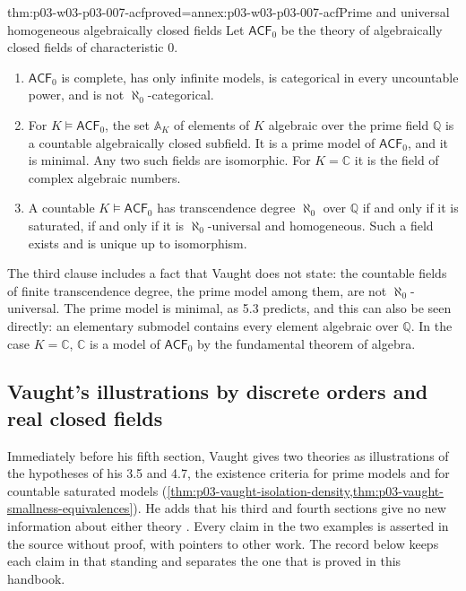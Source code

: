\begin{hbtheorem}{thm:p03-w03-p03-007-acf}{proved=annex:p03-w03-p03-007-acf}{Prime and universal homogeneous algebraically closed fields}
Let \(\mathsf{ACF}_0\) be the theory of algebraically closed fields of
characteristic \(0\).
\begin{enumerate}
\item \(\mathsf{ACF}_0\) is complete, has only infinite models, is
      categorical in every uncountable power, and is not
      \(\aleph_0\)-categorical.
\item For \(K\models\mathsf{ACF}_0\), the set \(\mathbb A_K\) of elements of
      \(K\) algebraic over the prime field \(\mathbb Q\) is a countable
      algebraically closed subfield. It is a prime model of
      \(\mathsf{ACF}_0\), and it is minimal. Any two such fields are
      isomorphic. For \(K=\mathbb C\) it is the field of complex algebraic
      numbers.
\item A countable \(K\models\mathsf{ACF}_0\) has transcendence degree
      \(\aleph_0\) over \(\mathbb Q\) if and only if it is saturated, if and
      only if it is \(\aleph_0\)-universal and homogeneous. Such a field exists
      and is unique up to isomorphism.
\end{enumerate}
\end{hbtheorem}

The third clause includes a fact that Vaught does not state: the countable
fields of finite transcendence degree, the prime model among them, are not
\(\aleph_0\)-universal. The prime model is minimal, as 5.3 predicts, and this
can also be seen directly: an elementary submodel contains every element
algebraic over \(\mathbb Q\). In the case \(K=\mathbb C\), \(\mathbb C\) is a
model of \(\mathsf{ACF}_0\) by the fundamental theorem of algebra.

\subsection{Vaught's illustrations by discrete orders and real closed fields}
\label{sec:p03-w03-p03-007-illustrations}

Immediately before his fifth section, Vaught gives two theories as
illustrations of the hypotheses of his 3.5 and 4.7, the existence criteria
for prime models and for countable saturated models
(\cref{thm:p03-vaught-isolation-density,thm:p03-vaught-smallness-equivalences}).
He adds that his third and fourth sections give no new information about
either theory \cite[p.~315]{Vaught1961}. Every claim in the two examples is
asserted in the source without proof, with pointers to other work. The
record below keeps each claim in that standing and separates the one that is
proved in this handbook.

